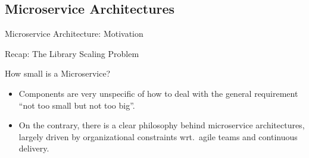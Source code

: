 \subsection{Microservice Architectures}
\begin{frame}{Microservice Architecture: Motivation}
	\begin{mycolumns}[animation=none]
		\begin{note}{Recap: The Library Scaling Problem}
			\centering
		\end{note}
	\mynextcolumn		
		\pause
		\begin{note}{How small is a Microservice?}
			\begin{itemize}
				\item Components are very unspecific of how to deal with the general requirement ``not too small but not too big''.
				\item On the contrary, there is a clear philosophy behind microservice architectures, largely driven by organizational constraints wrt.\ agile teams and continuous delivery.
			\end{itemize}
		\end{note}
		\pause
		\begin{definition}{}
		\end{definition}
	\end{mycolumns}
\end{frame}

